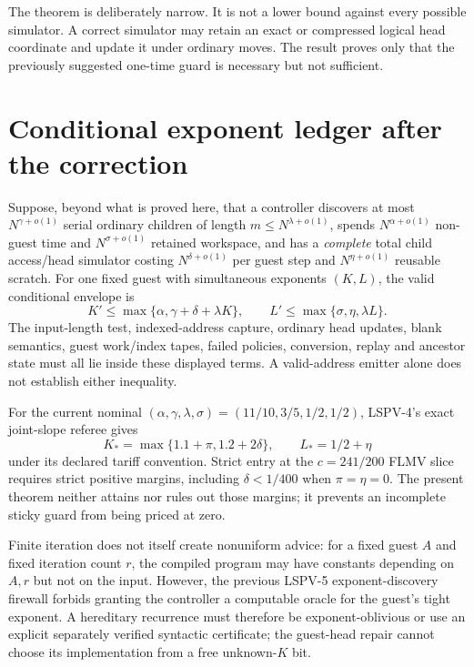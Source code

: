 \documentclass[11pt]{article}
\begin{document}
The theorem is deliberately narrow.  It is not a lower bound against every
possible simulator.  A correct simulator may retain an exact or compressed
logical head coordinate and update it under ordinary moves.  The result proves
only that the previously suggested one-time guard is necessary but not
sufficient.

\section{Conditional exponent ledger after the correction}
Suppose, beyond what is proved here, that a controller discovers at most
$N^{\gamma+o(1)}$ serial ordinary children of length
$m\le N^{\lambda+o(1)}$, spends $N^{\alpha+o(1)}$ non-guest time and
$N^{\sigma+o(1)}$ retained workspace, and has a \emph{complete} total child
access/head simulator costing $N^{\delta+o(1)}$ per guest step and
$N^{\eta+o(1)}$ reusable scratch.  For one fixed guest with simultaneous
exponents $(K,L)$, the valid conditional envelope is
\[
 K'\le\max\{\alpha,\gamma+\delta+\lambda K\},\qquad
 L'\le\max\{\sigma,\eta,\lambda L\}.
\]
The input-length test, indexed-address capture, ordinary head updates,
blank semantics, guest work/index tapes, failed policies, conversion,
replay and ancestor state must all lie inside these displayed terms.  A
valid-address emitter alone does not establish either inequality.

For the current nominal $(\alpha,\gamma,\lambda,\sigma)=(11/10,3/5,1/2,1/2)$,
LSPV-4's exact joint-slope referee gives
\[
 K_* = \max\{1.1+\pi,1.2+2\delta\},\qquad L_*=1/2+\eta
\]
under its declared tariff convention.  Strict entry at the $c=241/200$
FLMV slice requires strict positive margins, including
$\delta<1/400$ when $\pi=\eta=0$.  The present theorem neither attains nor
rules out those margins; it prevents an incomplete sticky guard from being
priced at zero.

Finite iteration does not itself create nonuniform advice: for a fixed guest
$A$ and fixed iteration count $r$, the compiled program may have constants
depending on $A,r$ but not on the input.  However, the previous LSPV-5
exponent-discovery firewall forbids granting the controller a computable
oracle for the guest's tight exponent.  A hereditary recurrence must therefore
be exponent-oblivious or use an explicit separately verified syntactic
certificate; the guest-head repair cannot choose its implementation from a
free unknown-$K$ bit.
\end{document}

